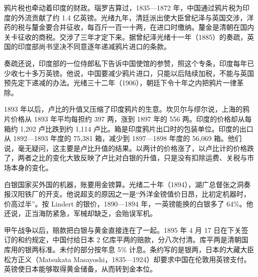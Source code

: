 鸦片税也牵动着印度的财政。瑙罗吉算过，1835—1872 年，中国通过鸦片税为印度的外流贡献了约 1.4 亿英镑\cite{naoroji1901}。光绪九年，清廷派出使大臣曾纪泽与英国交涉，洋药的税与釐金要合并征收，每百斤一百一十两，在进口时缴纳\cite{qingshigao}。釐金是清朝在国内关卡征收的商税。交涉了三年才定下来\cite{qingshigao}。据曾纪泽光绪十一年（1885）的奏疏，英国的印度部尚书坚决不同意逐年递减鸦片进口的条款\cite{qingshigao}。

奏疏还说，印度部的一位侍郎私下告诉中国使馆的参赞，照这个专条，印度每年已少收七十多万英镑\cite{qingshigao}。他说，中国要减少鸦片进口，只能以后陆续加税，不能与英国预先定下递减的办法\cite{qingshigao}。光绪三十二年（1906），朝廷下令十年之内把鸦片一律革除\cite{qingshigao}。

1893 年以后，卢比的升值又压缩了印度鸦片的生意。坎贝尔与缪尔说，上海的鸦片价格从 1893 年平均每担约 397 两，涨到 1897 年的 556 两\cite{fowler1899}。印度的价格却从每箱约 1,202 卢比跌到约 1,114 卢比\cite{fowler1899}。箱是印度鸦片出口时的包装单位。印度的出口从 1892—1893 年度的 75,381 箱，减少到 1897—1898 年度的 56,069 箱\cite{fowler1899}。他们说，毫无疑问，这主要是卢比升值的结果\cite{fowler1899}。以两计的价格涨了，以卢比计的价格跌了，两者之比的变化大致反映了卢比对白银的升值，只是没有扣除运费、关税与市场本身的变化。

白银国家买外国的机器，账要用金镑算。光绪二十年（1894），湖广总督张之洞奏报汉阳铁厂的开支\cite{qingshigao}。他说超支的原因之一是“外洋金镑值价日昂，比初定机器时，价高过半”\cite{qingshigao}。按 Lindert 的银价，1890—1894 年，一英镑能换的白银多了 64\%\cite{lindert2006}。他还说，正当海防紧急，军械却缺乏，会贻误军机\cite{qingshigao}。

甲午战争以后，赔款把白银与黄金直接连在了一起。1895 年 4 月 17 日在下关签订的和约规定，中国付给日本 2 亿库平两的赔款，分八次付清\cite{shimonoseki1895}。库平两是清朝国库用的银两标准。未付的部分按年息 5\% 计息\cite{shimonoseki1895}。条约写的是银两，日本的大藏大臣松方正义（Matsukata Masayoshi，1835—1924）却要求中国在伦敦用英镑支付\cite{mitchener2009,wikisource24}。英镑使日本能够取得黄金储备，从而转到金本位\cite{mitchener2009}。

